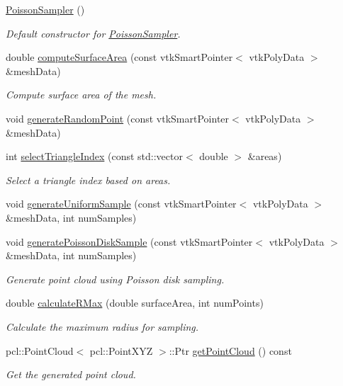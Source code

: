 \begin{DoxyCompactItemize}
\item 
\hyperlink{classvisioncraft_1_1utils_1_1PoissonSampler_a7bfb01ef24d01f16e51a0c6533db300a}{Poisson\+Sampler} ()
\begin{DoxyCompactList}\small\item\em Default constructor for \hyperlink{classvisioncraft_1_1utils_1_1PoissonSampler}{Poisson\+Sampler}. \end{DoxyCompactList}\item 
double \hyperlink{classvisioncraft_1_1utils_1_1PoissonSampler_a483e265853d48adab5ead1ce355caa7c}{compute\+Surface\+Area} (const vtk\+Smart\+Pointer$<$ vtk\+Poly\+Data $>$ \&mesh\+Data)
\begin{DoxyCompactList}\small\item\em Compute surface area of the mesh. \end{DoxyCompactList}\item 
void \hyperlink{classvisioncraft_1_1utils_1_1PoissonSampler_ad3669a4cf2cc622f867fbd2a08eb0f1a}{generate\+Random\+Point} (const vtk\+Smart\+Pointer$<$ vtk\+Poly\+Data $>$ \&mesh\+Data)
\item 
int \hyperlink{classvisioncraft_1_1utils_1_1PoissonSampler_a4b68225264977cf2df185889c2a105df}{select\+Triangle\+Index} (const std\+::vector$<$ double $>$ \&areas)
\begin{DoxyCompactList}\small\item\em Select a triangle index based on areas. \end{DoxyCompactList}\item 
void \hyperlink{classvisioncraft_1_1utils_1_1PoissonSampler_af6bf98478b4fcf448a66cecafe68e613}{generate\+Uniform\+Sample} (const vtk\+Smart\+Pointer$<$ vtk\+Poly\+Data $>$ \&mesh\+Data, int num\+Samples)
\item 
void \hyperlink{classvisioncraft_1_1utils_1_1PoissonSampler_a1a888b0e8d5664c138a99f8f1c3ab4f7}{generate\+Poisson\+Disk\+Sample} (const vtk\+Smart\+Pointer$<$ vtk\+Poly\+Data $>$ \&mesh\+Data, int num\+Samples)
\begin{DoxyCompactList}\small\item\em Generate point cloud using Poisson disk sampling. \end{DoxyCompactList}\item 
double \hyperlink{classvisioncraft_1_1utils_1_1PoissonSampler_ac3afe76a33d3ba2f0dfb709b92c6608d}{calculate\+R\+Max} (double surface\+Area, int num\+Points)
\begin{DoxyCompactList}\small\item\em Calculate the maximum radius for sampling. \end{DoxyCompactList}\item 
pcl\+::\+Point\+Cloud$<$ pcl\+::\+Point\+X\+YZ $>$\+::Ptr \hyperlink{classvisioncraft_1_1utils_1_1PoissonSampler_a2c245126548a8fb5aa02b3e07edecaee}{get\+Point\+Cloud} () const
\begin{DoxyCompactList}\small\item\em Get the generated point cloud. \end{DoxyCompactList}\end{DoxyCompactItemize}


